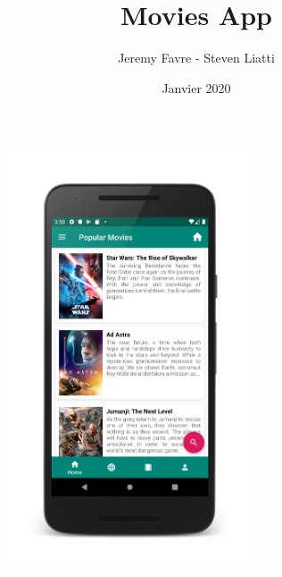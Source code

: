 \documentclass[a4paper, 12pt]{article}
\begin{document}
\title{Movies App}
\author{Jeremy Favre - Steven Liatti}
\date{Janvier 2020}
\maketitle
\begin{figure}
    \begin{center}
        \includegraphics[width=0.65\textwidth]{img/screenshots/movie_list_framed.png}
    \end{center}
\end{figure}
\newpage


\tableofcontents
{}
\listoffigures
\renewcommand\listoflistingscaption{Table des listings de code source}
\listoflistings
\end{document}
